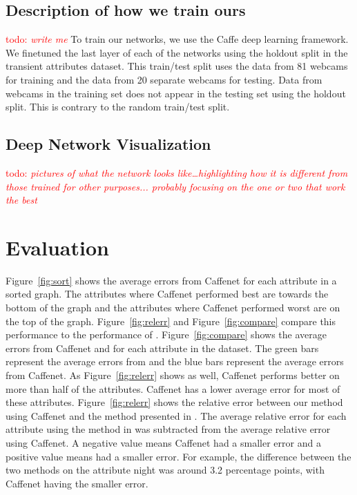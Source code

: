 \documentclass{article}
\newcommand{\todo}[1]{\textcolor{red}{todo: {\em #1}}}
\newcommand{\figref}[1]{Figure~\ref{fig:#1}}
\begin{document}
\subsection{Description of how we train ours}

\todo{write me}\newline 
\newline\indent
To train our networks, we use the Caffe \cite{caffe14} deep learning 
framework. We finetuned the last layer of each of the networks using the 
holdout split in the transient attributes dataset.  This train/test split uses
the data from 81 webcams for training and the data from 20 separate 
webcams for testing.  Data from webcams in the training set does not
appear in the testing set using the holdout split.  This is contrary to 
the random train/test split.  

\subsection{Deep Network Visualization}

\todo{pictures of what the network looks like\dots highlighting how it
is different from those trained for other purposes... probably
focusing on the one or two that work the best}

\section{Evaluation}
\indent
\figref{sort} shows the average errors from Caffenet for each attribute
in a sorted graph.  The attributes where Caffenet performed best are towards
the bottom of the graph and the attributes where Caffenet performed
worst are on the top of the graph. \figref{relerr} and \figref{compare} 
compare this performance to the performance of \cite{Laffont14}.
\newline\indent
\figref{compare} shows the average errors from Caffenet and \cite{Laffont14}
for each attribute in the dataset.  The green bars represent the average errors
from \cite{Laffont14} and the blue bars represent the average errors from Caffenet.
As \figref{relerr} shows as well, Caffenet performs better on more than half of 
the attributes.  Caffenet has a lower average error for most of these attributes.
\newline\indent
\figref{relerr} shows the relative error between our method using Caffenet
and the method presented in \cite{Laffont14}.  The average relative error 
for each attribute using the method in \cite{Laffont14} was subtracted from
the average relative error using Caffenet.  A negative value means Caffenet
had a smaller error and a positive value means \cite{Laffont14} had a smaller
error.  For example, the difference between the two methods on the attribute
night was around 3.2 percentage points, with Caffenet having the smaller 
error.
\end{document}
